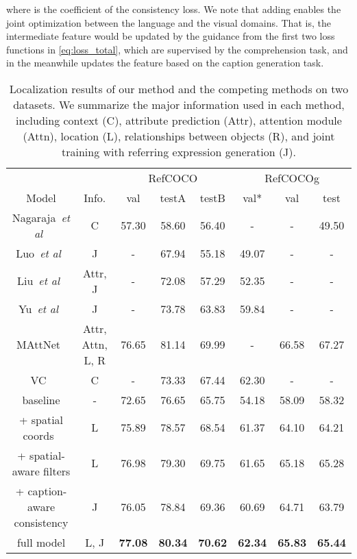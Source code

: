 \documentclass{bmvc2k}
\def\etal{\emph{et al}\bmvaOneDot}
\begin{document}
where  is the coefficient of the consistency loss.
We note that adding  enables the joint optimization between the language and the visual domains.
That is, the intermediate feature  would be updated by the guidance from the first two loss functions in \eqref{eq:loss_total}, which are supervised by the comprehension task, and in the meanwhile  updates the feature based on the caption generation task.
\begin{table}[!t]
	\centering
	\footnotesize
	\def\arraystretch{0.9}
	\setlength\tabcolsep{5pt}
	\caption{Localization results of our method and the competing methods on two datasets. We summarize the major information used in each method, including context (C), attribute prediction (Attr), attention module (Attn), location (L), relationships between objects (R), and joint training with referring expression generation (J).}
	\vspace{2mm}
	\label{tab:det}
	\begin{tabular}{@{}@{}c c c c c c c c@{}}
		\toprule
		& \multicolumn{1}{c}{} & \multicolumn{3}{c}{RefCOCO} & \multicolumn{3}{c}{RefCOCOg} \\
		\cmidrule(lr){3-5} \cmidrule(lr){6-8}
		Model & Info. & val & testA & testB & val* & val & test \\ \midrule
		Nagaraja~\etal~\cite{Nagaraja_ECCV_2016} & C & 57.30 & 58.60 & 56.40  & -  & - & 49.50 \\
		Luo~\etal~\cite{Luo_CVPR_2017} & J & - & 67.94 & 55.18 & 49.07 & - & - \\
		Liu~\etal~\cite{Liu_ICCV_2017_2}& Attr, J & - & 72.08 & 57.29 & 52.35 & - & - \\
		Yu~\etal~\cite{Yu_CVPR_2017} & J & - & 73.78 & 63.83 & 59.84 & - & - \\
MAttNet~\cite{Yu_CVPR_2018} & Attr, Attn, L, R & 76.65 & 81.14 & 69.99 & - & 66.58 & 67.27 \\
		VC~\cite{Zhang_CVPR_2018} & C & - & 73.33 & 67.44 & 62.30 & - & - \\
		\midrule
baseline & - & 72.65 & 76.65 & 65.75 & 54.18 & 58.09 & 58.32 \\
		+ spatial coords~\cite{Hu_ECCV_2016} & L & 75.89 & 78.57 & 68.54 & 61.37 & 64.10 & 64.21 \\
		+ spatial-aware filters & L & 76.98 & 79.30 & 69.75 & 61.65 & 65.18 & 65.28 \\
		+ caption-aware consistency & J & 76.05 & 78.84 & 69.36 & 60.69 & 64.71 & 63.79 \\
		full model & L, J & \textbf{77.08} & \textbf{80.34} & \textbf{70.62} & \textbf{62.34} & \textbf{65.83} & \textbf{65.44} \\
		\bottomrule
	\end{tabular}
	\vspace{-3mm}
\end{table}
\end{document}
